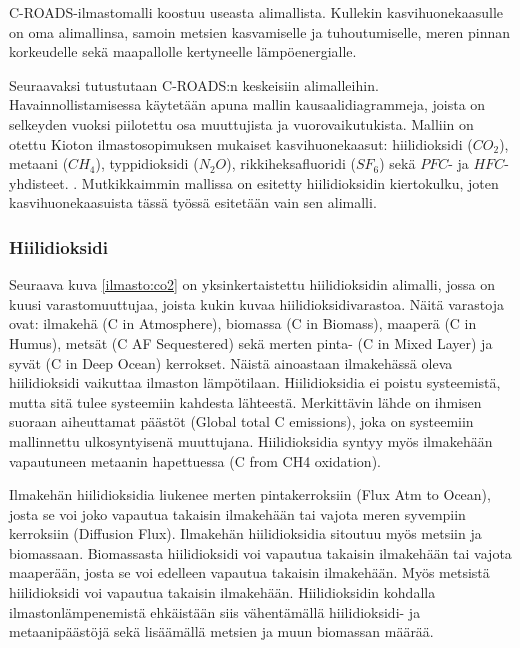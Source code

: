 \documentclass[finnish,12pt,a4paper,pdftex]{article}
\begin{document}
\begin{onehalfspacing}
C-ROADS-ilmastomalli koostuu useasta alimallista. Kullekin kasvihuonekaasulle on oma alimallinsa, samoin metsien kasvamiselle ja tuhoutumiselle, meren pinnan korkeudelle sekä maapallolle kertyneelle lämpöenergialle. \cite{Croads, CroadsFlightSimulator2011} %

Seuraavaksi tutustutaan C-ROADS:n keskeisiin alimalleihin. Havainnollistamisessa käytetään apuna mallin kausaalidiagrammeja, joista on selkeyden vuoksi piilotettu osa muuttujista ja vuorovaikutukista. Malliin on otettu Kioton ilmastosopimuksen \cite{KyotoManual} mukaiset kasvihuonekaasut: hiilidioksidi ($CO_2$), metaani ($CH_4$), typpidioksidi ($N_2O$), rikkiheksafluoridi ($SF_6$) sekä $PFC$- ja $HFC$-yhdisteet. \cite{Croads, CroadsFlightSimulator2011}.  Mutkikkaimmin mallissa on esitetty hiilidioksidin kiertokulku, joten kasvihuonekaasuista tässä työssä esitetään vain sen alimalli. %



\subsubsection{Hiilidioksidi \label{ilmasto:croads:co2}}

Seuraava kuva \ref{ilmasto:co2} on yksinkertaistettu hiilidioksidin alimalli, jossa on kuusi varastomuuttujaa, joista kukin kuvaa hiilidioksidivarastoa. Näitä varastoja ovat: ilmakehä (C in Atmosphere), biomassa (C in Biomass), maaperä (C in Humus), metsät (C AF Sequestered) sekä merten pinta- (C in Mixed Layer) ja syvät (C in Deep Ocean) kerrokset. Näistä ainoastaan ilmakehässä oleva hiilidioksidi vaikuttaa ilmaston lämpötilaan. Hiilidioksidia ei poistu systeemistä, mutta sitä tulee systeemiin kahdesta lähteestä. Merkittävin lähde on ihmisen suoraan aiheuttamat päästöt (Global total C emissions), joka on systeemiin mallinnettu ulkosyntyisenä muuttujana. Hiilidioksidia syntyy myös ilmakehään vapautuneen metaanin hapettuessa (C from CH4 oxidation). 

Ilmakehän hiilidioksidia liukenee merten pintakerroksiin (Flux Atm to Ocean), josta se voi joko vapautua takaisin ilmakehään tai vajota meren syvempiin kerroksiin (Diffusion Flux). Ilmakehän hiilidioksidia sitoutuu myös metsiin ja biomassaan. Biomassasta hiilidioksidi voi vapautua takaisin ilmakehään tai vajota maaperään, josta se voi edelleen vapautua takaisin ilmakehään. Myös metsistä hiilidioksidi voi vapautua takaisin ilmakehään. Hiilidioksidin kohdalla ilmastonlämpenemistä ehkäistään siis vähentämällä hiilidioksidi- ja metaanipäästöjä sekä lisäämällä metsien ja muun biomassan määrää. 


\end{onehalfspacing}
\end{document}
